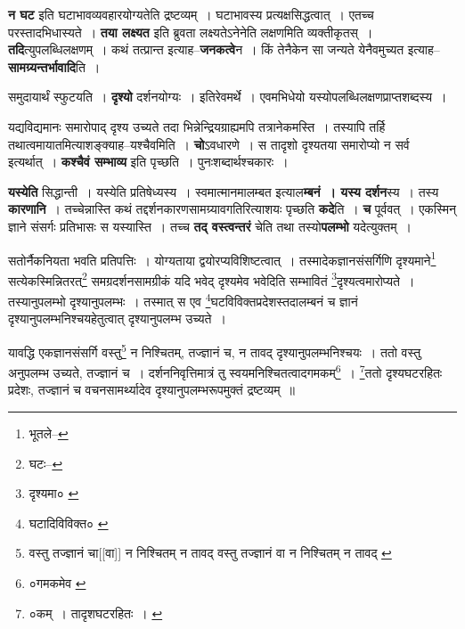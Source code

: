 \documentclass[article,12pt,a4paper]{memoir}
\begin{document}
	  \endgroup
	

	  \pstart \textbf{न घट} इति घटाभावव्यवहारयोग्यतेति द्रष्टव्यम् । घटाभावस्य प्रत्यक्षसिद्धत्वात् । एतच्च परस्तादभिधास्यते । \textbf{तया लक्ष्यत} इति ब्रुवता लक्ष्यतेऽनेनेति लक्षणमिति व्यक्तीकृतस् । \textbf{तदि}त्युपलब्धिलक्षणम् । कथं तत्प्रान्त इत्याह--\textbf{जनकत्वे}न । किं तेनैकेन सा जन्यते ये\leavevmode{}नैवमुच्यत इत्याह--\textbf{सामग्र्यन्तर्भावादि}ति ।
	\pend
      

	  \pstart समुदायार्थं स्फुटयति । \textbf{दृश्यो} दर्शनयोग्यः । इतिरेवमर्थे । एवमभिधेयो यस्योपलब्धिलक्षणप्राप्तशब्दस्य ।
	\pend
      

	  \pstart यद्यविद्यमानः समारोपाद् दृश्य उच्यते तदा भिन्नेन्द्रियग्राह्यमपि तत्रानेकमस्ति । तस्यापि तर्हि तथात्वमायातमित्याशङ्क्याह--यश्चैवमिति । \textbf{चो}ऽवधारणे । स तादृशो दृश्यतया समारोप्यो न सर्व इत्यर्थात् । \textbf{कश्चैवं सम्भाव्य} इति पृच्छति । पुनःशब्दार्थश्चकारः ।
	\pend
      

	  \pstart \textbf{यस्येति} सिद्धान्ती । यस्येति प्रतिषेध्यस्य । स्वमात्मानमालम्बत इत्याल\textbf{म्बनं । यस्य दर्शन}स्य । तस्य \textbf{कारणानि} । तच्चेन्नास्ति कथं तद्दर्शनकारणसामग्र्यावगतिरित्याशयः पृच्छति \textbf{कदे}ति । \textbf{च} पूर्ववत् । एकस्मिन् ज्ञाने संसर्गः प्रतिभासः स यस्यास्ति । तच्च \textbf{तद् वस्त्वन्तरं} चेति तथा तस्यो\textbf{पलम्भो} यदेत्युक्तम् ।
	\pend
	  \bigskip
	  \begingroup
	

	  \pstart सतोर्नैकनियता भवति प्रतिपत्तिः । योग्यताया द्वयोरप्यविशिष्टत्वात् । तस्मादेकज्ञानसंसर्गिणि दृश्यमाने\footnote{भूतले--\cite{dp-msD-n}} सत्येकस्मिन्नितरत्\footnote{घटः--\cite{dp-msD-n}} समग्रदर्शनसामग्रीकं यदि भवेद् दृश्यमेव भवेदिति सम्भावितं \footnote{दृश्यमा० \cite{dp-msA} \cite{dp-edP} \cite{dp-edH} \cite{dp-edE} \cite{dp-edN}}\-दृश्यत्वमारोप्यते । तस्यानुपलम्भो दृश्यानुपलम्भः । तस्मात् स एव \footnote{घटादिविविक्त० \cite{dp-msB}}\-घटविविक्तप्रदेशस्तदालम्बनं च ज्ञानं दृश्यानुपलम्भनिश्चयहेतुत्वात् दृश्यानुपलम्भ उच्यते ।
	\pend
       

	  \pstart यावद्धि एकज्ञानसंसर्गि वस्तु\footnote{वस्तु तज्ज्ञानं चा[[वा]] न निश्चितम् न तावद् \cite{dp-msB} वस्तु तज्ज्ञानं वा न निश्चितम् न तावद् \cite{dp-msD}} न निश्चितम्, तज्ज्ञानं च, न तावद् दृश्यानुपलम्भनिश्चयः । ततो वस्तु अनुपलम्भ उच्यते, तज्ज्ञानं च । दर्शननिवृत्तिमात्रं तु स्वयमनिश्चितत्वादगमकम्\footnote{०गमकमेव \cite{dp-msC}} । \footnote{०कम् । तादृशघटरहितः । \cite{dp-msB}}\-ततो दृश्यघटरहितः प्रदेशः, तज्ज्ञानं च वचनसामर्थ्यादेव दृश्यानुपलम्भरूपमुक्तं द्रष्टव्यम् ॥
	\pend
      
\end{document}
